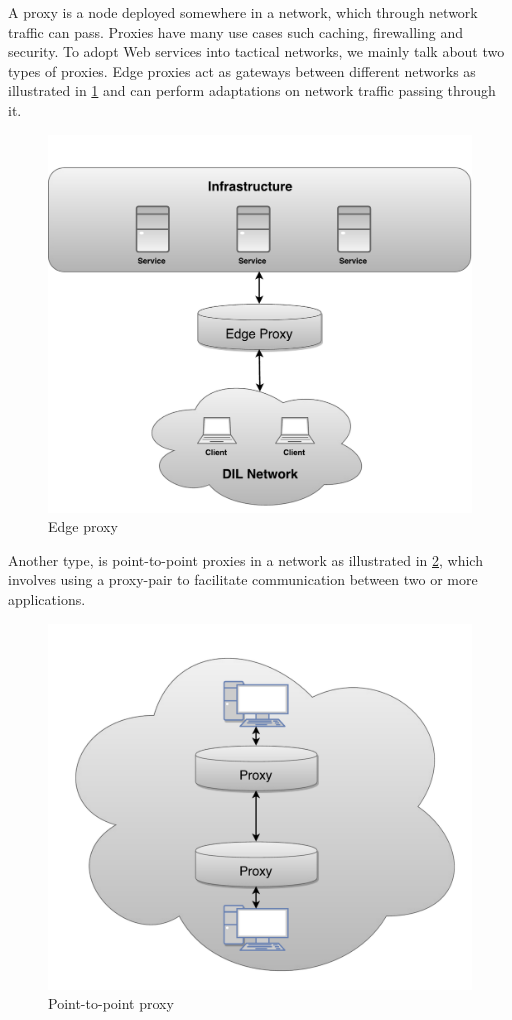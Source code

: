A proxy is a node deployed somewhere in a network, which through network traffic
can pass. Proxies have many use cases such caching, firewalling and security. To
adopt Web services into tactical networks, we mainly talk about two types of
proxies. Edge proxies act as gateways between different networks as illustrated
in \cref{figure:edge} and can perform adaptations on network traffic passing
through it.

\begin{figure}[h]
\includegraphics[scale=0.35]{images/edge_proxy.pdf}
\caption{Edge proxy}
\label{figure:edge}
\end{figure}

Another type, is point-to-point proxies in a network as illustrated in
\cref{figure:proxy-point}, which involves using a proxy-pair to facilitate
communication between two or more applications.

\begin{figure}[h]
\includegraphics[scale=0.35]{images/proxy_point.pdf}
\caption{Point-to-point proxy}
\label{figure:proxy-point}
\end{figure}

